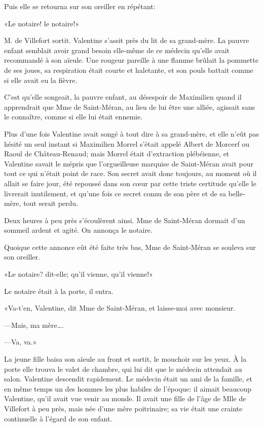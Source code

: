Puis elle se retourna sur son oreiller en répétant: 

«Le notaire! le notaire!» 

M. de Villefort sortit. Valentine s'assit près du lit de sa grand-mère. La pauvre enfant semblait avoir grand besoin elle-même de ce médecin qu'elle avait recommandé à son aïeule. Une rougeur pareille à une flamme brûlait la pommette de ses joues, sa respiration était courte et haletante, et son pouls battait comme si elle avait eu la fièvre. 

C'est qu'elle songeait, la pauvre enfant, au désespoir de Maximilien quand il apprendrait que Mme de Saint-Méran, au lieu de lui être une alliée, agissait sans le connaître, comme si elle lui était ennemie. 

Plus d'une fois Valentine avait songé à tout dire à sa grand-mère, et elle n'eût pas hésité un seul instant si Maximilien Morrel s'était appelé Albert de Morcerf ou Raoul de Château-Renaud; mais Morrel était d'extraction plébéienne, et Valentine savait le mépris que l'orgueilleuse marquise de Saint-Méran avait pour tout ce qui n'était point de race. Son secret avait donc toujours, au moment où il allait se faire jour, été repoussé dans son cœur par cette triste certitude qu'elle le livrerait inutilement, et qu'une fois ce secret connu de son père et de sa belle-mère, tout serait perdu. 

Deux heures à peu près s'écoulèrent ainsi. Mme de Saint-Méran dormait d'un sommeil ardent et agité. On annonça le notaire. 

Quoique cette annonce eût été faite très bas, Mme de Saint-Méran se souleva sur son oreiller. 

«Le notaire? dit-elle; qu'il vienne, qu'il vienne!» 

Le notaire était à la porte, il entra. 

«Va-t'en, Valentine, dit Mme de Saint-Méran, et laisse-moi avec monsieur. 

—Mais, ma mère\dots. 

—Va, va.» 

La jeune fille baisa son aïeule au front et sortit, le mouchoir sur les yeux. À la porte elle trouva le valet de chambre, qui lui dit que le médecin attendait au salon. Valentine descendit rapidement. Le médecin était un ami de la famille, et en même temps un des hommes les plus habiles de l'époque: il aimait beaucoup Valentine, qu'il avait vue venir au monde. Il avait une fille de l'âge de Mlle de Villefort à peu près, mais née d'une mère poitrinaire; sa vie était une crainte continuelle à l'égard de son enfant. 

